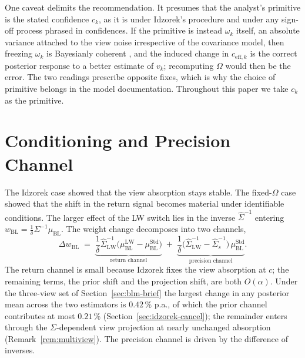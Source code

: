 \documentclass[a4paper,11pt]{article}
\theoremstyle{plain}
\theoremstyle{definition}
\newcommand{\Std}{\mathrm{Std}}
\newcommand{\LW}{\mathrm{LW}}
\newcommand{\eff}{\mathrm{eff}}
\begin{document}
One caveat delimits the recommendation. It presumes that the analyst's
primitive is the stated confidence $c_k$, as it is under Idzorek's
procedure and under any sign-off process phrased in confidences. If the
primitive is instead $\omega_k$ itself, an absolute variance attached
to the view noise irrespective of the covariance model, then freezing
$\omega_k$ is Bayesianly coherent \citep[cf.][]{KolmRitter2017}, and
the induced change in $c_{\eff,k}$ is the correct posterior response to
a better estimate of $v_k$; recomputing $\Omega$ would then be the
error. The two readings prescribe opposite fixes, which is why the
choice of primitive belongs in the model documentation. Throughout this
paper we take $c_k$ as the primitive.

\section{Conditioning and Precision Channel}
\label{sec:precision}

The Idzorek case showed that the view absorption stays stable. The
fixed-$\Omega$ case showed that the shift in the return signal becomes
material under identifiable conditions. The larger effect of the LW
switch lies in the inverse
$\hat\Sigma^{-1}$ entering
$w_{\mathrm{BL}} = \frac{1}{\delta}\Sigma^{-1}\mu_{\mathrm{BL}}$. The
weight change decomposes into two channels,
\[
    \Delta w_{\mathrm{BL}}
    \;=\; \underbrace{\frac{1}{\delta}\hat{\Sigma}_{\LW}^{-1}
          \bigl(\mu_{\mathrm{BL}}^{\LW} - \mu_{\mathrm{BL}}^{\Std}\bigr)
         }_{\text{return channel}}
    \;+\; \underbrace{\frac{1}{\delta}
          \bigl(\hat{\Sigma}_{\LW}^{-1} - \hat{\Sigma}_s^{-1}\bigr)\,
          \mu_{\mathrm{BL}}^{\Std}
         }_{\text{precision channel}}.
\]
The return channel is small because Idzorek fixes the view absorption
at $c$; the remaining terms, the prior shift and the projection shift,
are both $O(\alpha)$. Under the three-view set of
Section~\ref{sec:blm-brief} the largest change in any posterior mean
across the two estimators is $0.42\,\%$ p.a., of which the prior
channel contributes at most $0.21\,\%$
(Section~\ref{sec:idzorek-cancel}); the remainder enters through the
$\Sigma$-dependent view projection at nearly unchanged absorption
(Remark~\ref{rem:multiview}). The precision
channel is driven by the difference of inverses.
\end{document}
